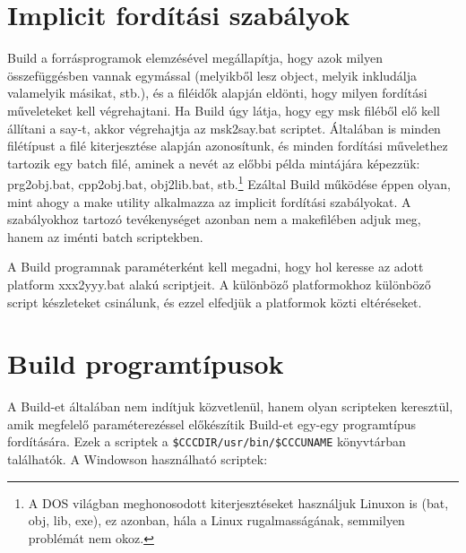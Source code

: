 \section{Implicit fordítási szabályok}

Build a forrásprogramok elemzésével megállapítja, hogy azok
milyen összefüggésben vannak egymással (melyikből lesz object,
melyik inkludálja valamelyik másikat, stb.), és a filéidők alapján
eldönti, hogy milyen fordítási műveleteket kell végrehajtani.
Ha Build úgy látja, hogy egy msk filéből elő kell állítani a
say-t, akkor végrehajtja az msk2say.bat 
scriptet. Általában is minden filétípust a filé kiterjesztése
alapján azonosítunk, és minden fordítási művelethez tartozik
egy batch filé, aminek a nevét az előbbi példa mintájára képezzük:
prg2obj.bat, cpp2obj.bat, obj2lib.bat, stb.\footnote{
A DOS világban meghonosodott kiterjesztéseket használjuk
Linuxon is (bat, obj, lib, exe), ez azonban, hála a Linux
rugalmasságának, semmilyen problémát nem okoz.}
Ezáltal Build működése éppen olyan, mint ahogy a make utility
alkalmazza az implicit fordítási szabályokat. A szabályokhoz
tartozó tevékenységet azonban nem a makefilében adjuk meg, 
hanem az iménti batch scriptekben.

A Build programnak paraméterként kell megadni, hogy hol keresse 
az adott platform xxx2yyy.bat alakú scriptjeit. A különböző
platformokhoz különböző script készleteket csinálunk, és ezzel
elfedjük a platformok közti eltéréseket.


\section{Build programtípusok}

A Build-et általában nem indítjuk közvetlenül, hanem olyan
scripteken keresztül, amik megfelelő paraméterezéssel előkészítik
Build-et egy-egy programtípus fordítására. Ezek a scriptek
a {\tt \$CCCDIR/usr/bin/\$CCCUNAME} könyvtárban találhatók.
A Windowson használható scriptek:

